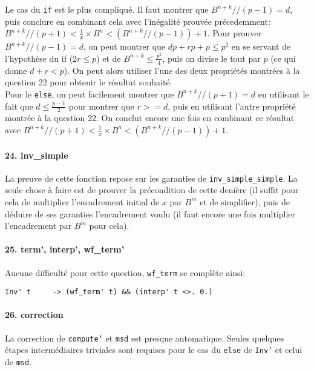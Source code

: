 \documentclass[a4paper]{article}%
\begin{document}
	Le cas du \texttt{if} est le plus compliqué. Il faut montrer que $B^{n+k} // (p-1) = d$,
	puis conclure en combinant cela avec l'inégalité prouvée précedemment: $B^{n+k} // (p+1) < \frac{1}{x} \times B^n < (B^{n+k} // (p-1)) + 1$.
	Pour prouver $B^{n+k} // (p-1) = d$, on peut montrer que $dp + rp + p \leq p^2$ en se servant de l'hypothèse du if
	($ 2r \leq p $) et de $B^{n+k} \leq \frac{p^2}{4}$, puis on divise le tout par $p$ (ce qui donne $d + r < p$). On peut alors
	utiliser l'une des deux propriétés montrées à la question 22 pour obtenir le résultat souhaité.\\

	Pour le \texttt{else}, on peut facilement montrer que $B^{n+k} // (p+1) = d$ en utilisant le fait que $d \leq \frac{p-1}{2}$
	pour montrer que $r >= d$, puis en utilisant l'autre propriété montrée à la question 22.
	On conclut encore une fois en combinant ce résultat avec $B^{n+k} // (p+1) < \frac{1}{x} \times B^n < (B^{n+k} // (p-1)) + 1$.

	\paragraph{24. inv\_simple} La preuve de cette fonction repose sur les garanties de \texttt{inv_simple_simple}.
	La seule chose à faire est de prouver la précondition de cette denière (il suffit pour cela de multiplier l'encadrement
	initial de $x$ par $B^m$ et de simplifier), puis de déduire de ses garanties l'encadrement voulu (il faut encore une fois
	multiplier l'encadrement par $B^m$ pour cela).

	\paragraph{25. term', interp', wf\_term'} Aucune difficulté pour cette question, \texttt{wf_term} se complète ainsi:
	\begin{verbatim}
Inv' t     -> (wf_term' t) && (interp' t <>. 0.)
	\end{verbatim}

	\paragraph{26. correction} La correction de \texttt{compute'} et \texttt{msd} est presque automatique.
	Seules quelques étapes intermédiaires triviales sont requises pour le cas du \texttt{else} de \texttt{Inv'}
	et celui de \texttt{msd}.
\end{document}
